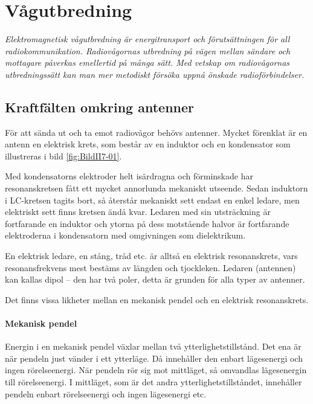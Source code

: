 \chapter{Vågutbredning}
\label{vågutbredning}

\noindent\emph{Elektromagnetisk vågutbredning är energitransport och
  förutsättningen för all radiokommunikation.
  Radiovågornas utbredning på vägen mellan sändare och mottagare påverkas
  emellertid på många sätt.
  Med vetskap om radiovågornas utbredningssätt kan man mer
  metodiskt försöka uppnå önskade radioförbindelser.}

\section[Kraftfält antenner]{Kraftfälten omkring antenner}

För att sända ut och ta emot radiovågor behövs antenner.
Mycket förenklat är en antenn en elektrisk krets, som består av en induktor
och en kondensator som illustreras i bild \ref{fig:BildII7-01}.

Med kondensatorns elektroder helt isärdragna och förminskade har
resonanskretsen fått ett mycket annorlunda mekaniskt utseende.
Sedan induktorn i LC-kretsen tagits bort, så återstår mekaniskt sett endast
en enkel ledare, men elektriskt sett finns kretsen ändå kvar.
Ledaren med sin utsträckning är fortfarande en induktor och ytorna på dess
motstående halvor är fortfarande elektroderna i kondensatorn med
omgivningen som dielektrikum.

En elektrisk ledare, en stång, tråd etc. är alltså en elektrisk
resonanskrets, vars resonansfrekvens mest bestäms av längden och
tjockleken. Ledaren (antennen) kan kallas dipol -- den har två poler,
detta är grunden för alla typer av antenner.


Det finns vissa likheter mellan en mekanisk pendel och en elektrisk
resonanskrets.

\subsubsection{Mekanisk pendel}

Energin i en mekanisk pendel växlar mellan två ytterlighetstillstånd.
Det ena är när pendeln just vänder i ett ytterläge.
Då innehåller den enbart lägesenergi och ingen rörelseenergi.
När pendeln rör sig mot mittläget, så omvandlas lägesenergin till rörelseenergi.
I mittläget, som är det andra ytterlighetstillståndet, innehåller pendeln enbart
rörelseenergi och ingen lägesenergi etc.

